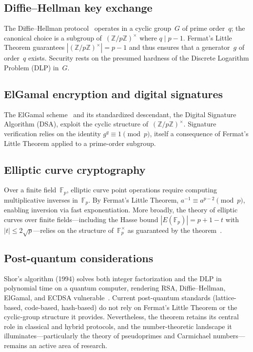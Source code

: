 \documentclass[12pt]{amsart}
\theoremstyle{plain}
\theoremstyle{definition}
\theoremstyle{remark}
\newcommand{\Z}{\mathbb{Z}}
\newcommand{\F}{\mathbb{F}}
\begin{document}
\subsection{Diffie--Hellman key exchange}\label{subsec:dh}

The Diffie--Hellman protocol~\cite{diffiehellman1976} operates in a
cyclic group~$G$ of prime order~$q$; the canonical choice is a
subgroup of~$(\Z/p\Z)^{\times}$ where $q\mid p-1$.  Fermat's Little
Theorem guarantees $|(\Z/p\Z)^{\times}|=p-1$ and thus ensures that a
generator~$g$ of order~$q$ exists.  Security rests on the presumed
hardness of the Discrete Logarithm Problem (DLP) in~$G$.

\subsection{ElGamal encryption and digital signatures}\label{subsec:elgamal}

The ElGamal scheme~\cite{elgamal1985} and its standardized
descendant, the Digital Signature Algorithm (DSA), exploit the cyclic
structure of~$(\Z/p\Z)^{\times}$.  Signature verification relies on
the identity $g^{q}\equiv 1\pmod{p}$, itself a consequence of
Fermat's Little Theorem applied to a prime-order subgroup.

\subsection{Elliptic curve cryptography}\label{subsec:ecc}

Over a finite field~$\F_{p}$, elliptic curve point operations require
computing multiplicative inverses in~$\F_{p}$.  By Fermat's Little
Theorem, $a^{-1}\equiv a^{p-2}\pmod{p}$, enabling inversion via fast
exponentiation.  More broadly, the theory of elliptic curves over
finite fields---including the Hasse bound
$|E(\F_{p})|=p+1-t$ with $|t|\le 2\sqrt{p}$---relies on the
structure of~$\F_{p}^{\times}$ as guaranteed by the
theorem~\cite{washington2008}.

\subsection{Post-quantum considerations}\label{subsec:pq}

Shor's algorithm (1994) solves both integer factorization and the DLP
in polynomial time on a quantum computer, rendering RSA,
Diffie--Hellman, ElGamal, and ECDSA
vulnerable~\cite{katzlindell,odlyzko1985}.  Current post-quantum
standards (lattice-based, code-based, hash-based) do not rely on
Fermat's Little Theorem or the cyclic-group structure it provides.  Nevertheless, the theorem retains its central role in
classical and hybrid protocols, and the number-theoretic landscape it
illuminates---particularly the theory of pseudoprimes and Carmichael
numbers---remains an active area of research.
\end{document}
